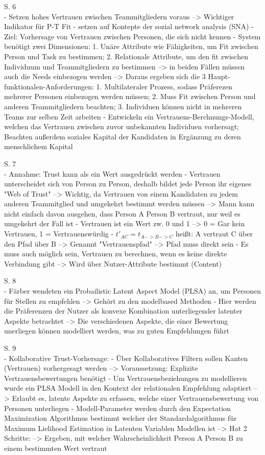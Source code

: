 S. 6\\
- Setzen hohes Vertrauen zwischen Teammitgliedern voraus --> Wichtiger Indikator für P-T Fit
- setzen auf Kontepte der sozial network analysis (SNA)
- Ziel: Vorhersage von Vertrauen zwischen Personen, die sich nicht kennen
- System benötigt zwei Dimensionen: 1. Unäre Attribute wie Fähigkeiten, um Fit zwischen Person und Task zu bestimmen; 2. Relationale Attribute, um den fit zwischen Individuum und Teammitgliedern zu bestimmen --> in beiden Fällen müssen auch die Needs einbezogen werden --> Daraus ergeben sich die 3 Haupt-funktionalen-Anforderungen: 1. Multilateraler Prozess, sodass Präferezen mehrerer Personen einbezogen werden müssen; 2. Muss Fit zwischen Person und anderen Teammitgliedern beachten; 3. Individuen können nicht in mehreren Teams zur selben Zeit arbeiten
- Entwickeln ein Vertrauens-Berchnungs-Modell, welchen das Vertrauen zwischen zuvor unbekannten Individuen vorhersagt; Beachten außerdem soziales Kapital der Kandidaten in Ergänzung zu deren menschlichem Kapital

S. 7\\
- Annahme: Trust kann als ein Wert ausgedrückt werden
- Vertrauen unterscheidet sich von Person zu Person, deshalb bildet jede Person ihr eigenes "Web of Trust" --> Wichtig, da Vertrauen von einem Kandidaten zu jedem anderen Teammitglied und umgekehrt bestimmt werden müssen --> Mann kann nicht einfach davon ausgehen, dass Person A Person B vertraut, nur weil es umgekehrt der Fall ist
- Vertrauen ist ein Wert zw. 0 und 1 --> 0 = Gar kein Vertrauen, 1 = Vertrauenswürdig
- $t'_{AC} = t_{A->B->C}$ heißt: A vertraut C über den Pfad über B --> Genannt "Vertrauenspfad" --> Pfad muss direkt sein
- Es muss auch möglich sein, Vertrauen zu berechnen, wenn es keine direkte Verbindung gibt --> Wird über Nutzer-Attribute bestimmt (Content)

S. 8\\
- Färber wendeten ein Probailistic Latent Aspect Model (PLSA) an, um Personen für Stellen zu empfehlen --> Gehört zu den modelbased Methoden
- Hier werden die Präferenzen der Nutzer als konvexe Kombination unterliegender latenter Aspekte betrachtet --> Die verschiedenen Aspekte, die einer Bewertung unerliegen können modelliert werden, was zu guten Empfehlungen führt

S. 9\\
- Kollaborative Trust-Vorhersage:
- Über Kollaboratives Filtern sollen Kanten (Vertrauen) vorhergesagt werden --> Voraussetzung: Explizite Vertrauensbewertungen benötigt
- Um Vertrauensbeziehungen zu modellieren wurde ein PLSA Modell in den Kontext der relationalen Empfehlung adaptiert --> Erlaubt es, latente Aspekte zu erfassen, welche einer Vertrauensbewertung von Personen unterliegen
- Modell-Parameter werden durch den Expectation Maximization Algorithmus bestimmt welcher der Standardalgorithmus für Maximum Lielihood Estimation in Latenten Variablen Modellen ist --> Hat 2 Schritte: --> Ergeben, mit welcher Wahrscheinlichkeit Person A Person B zu einem bestimmten Wert vertraut


